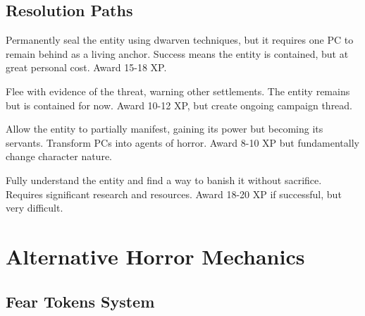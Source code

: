 \documentclass[11pt]{article}
\begin{document}
\subsection*{Resolution Paths}

\begin{description}[leftmargin=*]
\item[The Sacrifice] Permanently seal the entity using dwarven techniques, but it requires one PC to remain behind as a living anchor. Success means the entity is contained, but at great personal cost. Award 15-18 XP.
\item[The Escape] Flee with evidence of the threat, warning other settlements. The entity remains but is contained for now. Award 10-12 XP, but create ongoing campaign thread. 
\item[The Corruption] Allow the entity to partially manifest, gaining its power but becoming its servants. Transform PCs into agents of horror. Award 8-10 XP but fundamentally change character nature.
\item[The Investigation] Fully understand the entity and find a way to banish it without sacrifice. Requires significant research and resources. Award 18-20 XP if successful, but very difficult.
\end{description}

\section*{Alternative Horror Mechanics}

\subsection*{Fear Tokens System}
\end{document}
